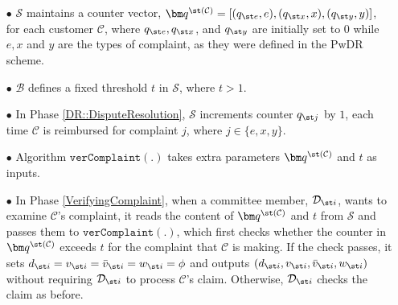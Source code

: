 \begin{itemize}
\item[$\bullet$]  $\mathcal{S}$ maintains a  counter vector, $\bm q^{\st (\mathcal{C})}=[(q_{\st e}, e),(q_{\st  x}, x),(q_{\st y}, y)]$,  for each customer $\mathcal{C}$, where  $q_{\st e}, q_{\st x}$, and $q_{\st y}$ are initially set to $0$ while $e, x$ and $y$ are the types of complaint, as they were defined in the PwDR scheme. 

\item[$\bullet$]    $\mathcal{B}$ defines a fixed threshold $t$ in   $\mathcal{S}$,  where $t >1$. 

\item[$\bullet$] In Phase \ref{DR::DisputeResolution}, $\mathcal{S}$ increments counter $q_{\st j}$ by $1$, each time   $\mathcal{C}$ is reimbursed for complaint $j$, where $j\in \{e,x,y\}$. 



\item[$\bullet$]  Algorithm $\mathtt{verComplaint}(.)$ takes extra parameters $\bm q^{\st (\mathcal{C})}$ and $t$ as inputs.  


\item[$\bullet$] In Phase \ref{VerifyingComplaint}, when a committee member, $\mathcal{D}_{\st i}$, wants to examine  $\mathcal{C}$'s  complaint, it reads the content of $\bm q^{\st (\mathcal{C})}$ and $t$ from $\mathcal{S}$ and passes them to $\mathtt{verComplaint}(.)$, which first checks whether the counter in $\bm q^{\st (\mathcal{C})}$ exceeds  $t$ for the complaint that $\mathcal{C}$ is making. If the check passes, it sets $d_{\st i}= v_{\st i}= \bar v_{\st i}=  w_{\st i}=\phi$ and outputs $(d_{\st i}, v_{\st i}, \bar v_{\st i},  w_{\st i})$ without requiring $\mathcal{D}_{\st i}$ to process $\mathcal{C}$'s claim. Otherwise,  $\mathcal{D}_{\st i}$ checks the claim as before.  

\end{itemize}

